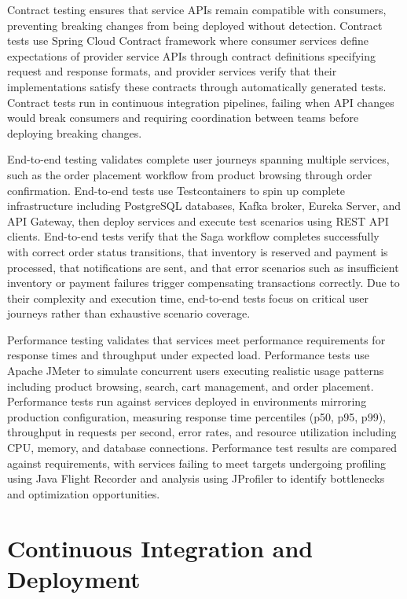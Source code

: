 Contract testing ensures that service APIs remain compatible with consumers, preventing breaking changes from being deployed without detection. Contract tests use Spring Cloud Contract framework where consumer services define expectations of provider service APIs through contract definitions specifying request and response formats, and provider services verify that their implementations satisfy these contracts through automatically generated tests. Contract tests run in continuous integration pipelines, failing when API changes would break consumers and requiring coordination between teams before deploying breaking changes.

End-to-end testing validates complete user journeys spanning multiple services, such as the order placement workflow from product browsing through order confirmation. End-to-end tests use Testcontainers to spin up complete infrastructure including PostgreSQL databases, Kafka broker, Eureka Server, and API Gateway, then deploy services and execute test scenarios using REST API clients. End-to-end tests verify that the Saga workflow completes successfully with correct order status transitions, that inventory is reserved and payment is processed, that notifications are sent, and that error scenarios such as insufficient inventory or payment failures trigger compensating transactions correctly. Due to their complexity and execution time, end-to-end tests focus on critical user journeys rather than exhaustive scenario coverage.

Performance testing validates that services meet performance requirements for response times and throughput under expected load. Performance tests use Apache JMeter to simulate concurrent users executing realistic usage patterns including product browsing, search, cart management, and order placement. Performance tests run against services deployed in environments mirroring production configuration, measuring response time percentiles (p50, p95, p99), throughput in requests per second, error rates, and resource utilization including CPU, memory, and database connections. Performance test results are compared against requirements, with services failing to meet targets undergoing profiling using Java Flight Recorder and analysis using JProfiler to identify bottlenecks and optimization opportunities.

\section{Continuous Integration and Deployment}

